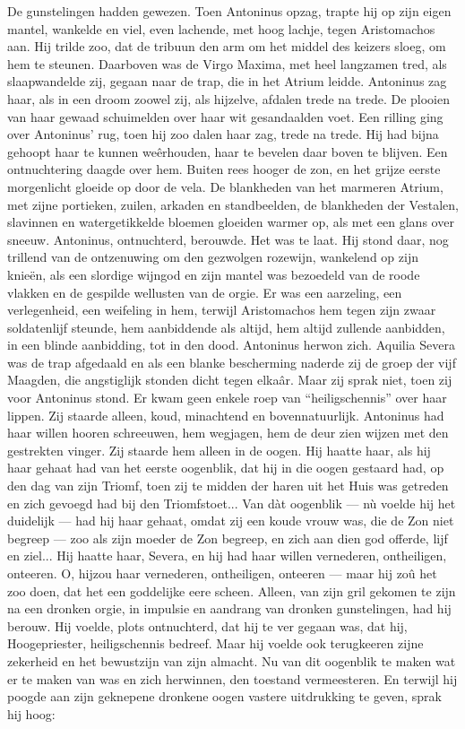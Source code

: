 \documentclass[a4paper, 12pt, oneside, dutch]{article}
\begin{document}
De gunstelingen hadden gewezen. Toen Antoninus opzag, trapte hij op zijn eigen mantel, wankelde en viel, even lachende, met hoog lachje, tegen Aristomachos aan. Hij trilde zoo, dat de tribuun den arm om het middel des keizers sloeg, om hem te steunen. Daarboven was de Virgo Maxima, met heel langzamen tred, als slaapwandelde zij, gegaan naar de trap, die in het Atrium leidde. Antoninus zag haar, als in een droom zoowel zij, als hijzelve, afdalen trede na trede. De plooien van haar gewaad schuimelden over haar wit gesandaalden voet. Een rilling ging over Antoninus' rug, toen hij zoo dalen haar zag, trede na trede. Hij had bijna gehoopt haar te kunnen weêrhouden, haar te bevelen daar boven te blijven. Een ontnuchtering daagde over hem. Buiten rees hooger de zon, en het grijze eerste morgenlicht gloeide op door de vela. De blankheden van het marmeren Atrium, met zijne portieken, zuilen, arkaden en standbeelden, de blankheden der Vestalen, slavinnen en watergetikkelde bloemen gloeiden warmer op, als met een glans over sneeuw. Antoninus, ontnuchterd, berouwde. Het was te laat. Hij stond daar, nog trillend van de ontzenuwing om den gezwolgen rozewijn, wankelend op zijn knieën, als een slordige wijngod en zijn mantel was bezoedeld van de roode vlakken en de gespilde wellusten van de orgie. Er was een aarzeling, een verlegenheid, een weifeling in hem, terwijl Aristomachos hem tegen zijn zwaar soldatenlijf steunde, hem aanbiddende als altijd, hem altijd zullende aanbidden, in een blinde aanbidding, tot in den dood. Antoninus herwon zich. Aquilia Severa was de trap afgedaald en als een blanke bescherming naderde zij de groep der vijf Maagden, die angstiglijk stonden dicht tegen elkaâr. Maar zij sprak niet, toen zij voor Antoninus stond. Er kwam geen enkele roep van "`heiligschennis"' over haar lippen. Zij staarde alleen, koud, minachtend en bovennatuurlijk. Antoninus had haar willen hooren schreeuwen, hem wegjagen, hem de deur zien wijzen met den gestrekten vinger. Zij staarde hem alleen in de oogen. Hij haatte haar, als hij haar gehaat had van het eerste oogenblik, dat hij in die oogen gestaard had, op den dag van zijn Triomf, toen zij te midden der haren uit het Huis was getreden en zich gevoegd had bij den Triomfstoet... Van dàt oogenblik --- nù voelde hij het duidelijk --- had hij haar gehaat, omdat zij een koude vrouw was, die de Zon niet begreep --- zoo als zijn moeder de Zon begreep, en zich aan dien god offerde, lijf en ziel... Hij haatte haar, Severa, en hij had haar willen vernederen, ontheiligen, onteeren. O, hijzou haar vernederen, ontheiligen, onteeren --- maar hij zoû het zoo doen, dat het een goddelijke eere scheen. Alleen, van zijn gril gekomen te zijn na een dronken orgie, in impulsie en aandrang van dronken gunstelingen, had hij berouw. Hij voelde, plots ontnuchterd, dat hij te ver gegaan was, dat hij, Hoogepriester, heiligschennis bedreef. Maar hij voelde ook terugkeeren zijne zekerheid en het bewustzijn van zijn almacht. Nu van dit oogenblik te maken wat er te maken van was en zich herwinnen, den toestand vermeesteren. En terwijl hij poogde aan zijn geknepene dronkene oogen vastere uitdrukking te geven, sprak hij hoog:
\end{document}

